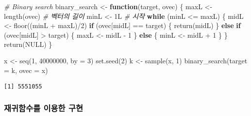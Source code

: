\documentclass[
  11pt,
]{krantz}
\newenvironment{Shaded}{\begin{snugshade}}{\end{snugshade}}
\newcommand{\AttributeTok}[1]{\textcolor[rgb]{0.61,0.61,0.61}{#1}}
\newcommand{\CommentTok}[1]{\textcolor[rgb]{0.37,0.37,0.37}{\textit{#1}}}
\newcommand{\ConstantTok}[1]{\textcolor[rgb]{0,0,0}{#1}}
\newcommand{\ControlFlowTok}[1]{\textcolor[rgb]{0.27,0.27,0.27}{\textbf{#1}}}
\newcommand{\DecValTok}[1]{\textcolor[rgb]{0.06,0.06,0.06}{#1}}
\newcommand{\FunctionTok}[1]{\textcolor[rgb]{0,0,0}{#1}}
\newcommand{\NormalTok}[1]{#1}
\newcommand{\OtherTok}[1]{\textcolor[rgb]{0.37,0.37,0.37}{#1}}
\newcommand{\SpecialCharTok}[1]{\textcolor[rgb]{0,0,0}{#1}}
\begin{document}
\begin{Shaded}
\begin{Highlighting}[]
\CommentTok{\# Binary search}
\NormalTok{binary\_search }\OtherTok{\textless{}{-}} \ControlFlowTok{function}\NormalTok{(target, ovec) \{}
\NormalTok{  maxL }\OtherTok{\textless{}{-}} \FunctionTok{length}\NormalTok{(ovec) }\CommentTok{\# 벡터의 길이}
\NormalTok{  minL }\OtherTok{\textless{}{-}}\NormalTok{ 1L }\CommentTok{\# 시작 }
  \ControlFlowTok{while}\NormalTok{ (minL }\SpecialCharTok{\textless{}=}\NormalTok{ maxL) \{}
\NormalTok{    midL }\OtherTok{\textless{}{-}} \FunctionTok{floor}\NormalTok{((minL }\SpecialCharTok{+}\NormalTok{ maxL)}\SpecialCharTok{/}\DecValTok{2}\NormalTok{)}
    \ControlFlowTok{if}\NormalTok{ (ovec[midL] }\SpecialCharTok{==}\NormalTok{ target) \{}
      \FunctionTok{return}\NormalTok{(midL)}
\NormalTok{    \} }\ControlFlowTok{else} \ControlFlowTok{if}\NormalTok{ (ovec[midL] }\SpecialCharTok{\textgreater{}}\NormalTok{ target) \{}
\NormalTok{      maxL }\OtherTok{\textless{}{-}}\NormalTok{ midL }\SpecialCharTok{{-}} \DecValTok{1}
\NormalTok{    \} }\ControlFlowTok{else}\NormalTok{ \{}
\NormalTok{      minL }\OtherTok{\textless{}{-}}\NormalTok{ midL }\SpecialCharTok{+} \DecValTok{1}
\NormalTok{    \}}
\NormalTok{  \}}
  \FunctionTok{return}\NormalTok{(}\ConstantTok{NULL}\NormalTok{)}
\NormalTok{\}}

\NormalTok{x }\OtherTok{\textless{}{-}} \FunctionTok{seq}\NormalTok{(}\DecValTok{1}\NormalTok{, }\DecValTok{40000000}\NormalTok{, }\AttributeTok{by =} \DecValTok{3}\NormalTok{)}
\FunctionTok{set.seed}\NormalTok{(}\DecValTok{2}\NormalTok{)}
\NormalTok{k }\OtherTok{\textless{}{-}} \FunctionTok{sample}\NormalTok{(x, }\DecValTok{1}\NormalTok{)}
\FunctionTok{binary\_search}\NormalTok{(}\AttributeTok{target =}\NormalTok{ k, }\AttributeTok{ovec =}\NormalTok{ x)}
\end{Highlighting}
\end{Shaded}

\begin{verbatim}
[1] 5551055
\end{verbatim}

\normalsize

\hypertarget{uxc7acuxadc0uxd568uxc218uxb97c-uxc774uxc6a9uxd55c-uxad6cuxd604}{%
\subsubsection*{재귀함수를 이용한 구현}\label{uxc7acuxadc0uxd568uxc218uxb97c-uxc774uxc6a9uxd55c-uxad6cuxd604}}
\end{document}
